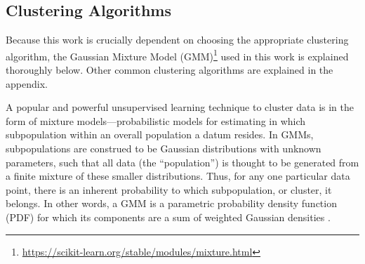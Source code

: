 \documentclass[fleqn,usenatbib,useAMS]{mnras}
\begin{document}

\subsection{Clustering Algorithms}\label{subsec:algorithms}

Because this work is crucially dependent on choosing the appropriate clustering algorithm, the Gaussian Mixture Model (GMM)\footnote{\url{https://scikit-learn.org/stable/modules/mixture.html}} used in this work is explained thoroughly below. Other common clustering algorithms are explained in the appendix.


A popular and powerful unsupervised learning technique to cluster data is in the form of mixture models---probabilistic models for estimating in which subpopulation within an overall population a datum resides. In GMMs, subpopulations are construed to be Gaussian distributions with unknown parameters, such that all data (the ``population'') is thought to be generated from a finite mixture of these smaller distributions. Thus, for any one particular data point, there is an inherent probability to which subpopulation, or cluster, it belongs. In other words, a GMM is a parametric probability density function (PDF) for which its components are a sum of weighted Gaussian densities \citep{Reynolds09}. \par
\end{document}

